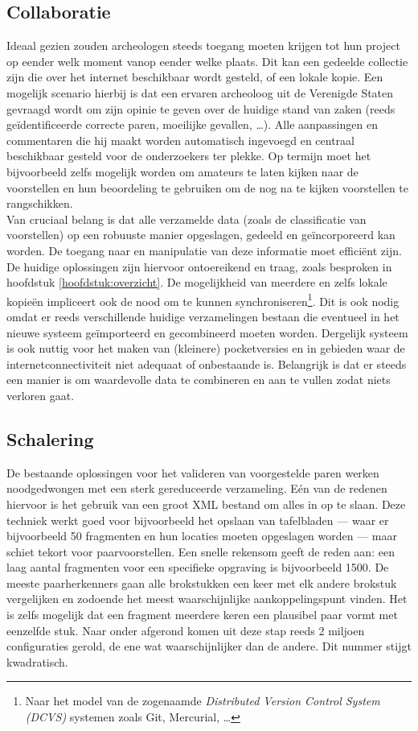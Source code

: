 \subsection{Collaboratie}
Ideaal gezien zouden archeologen steeds toegang moeten krijgen tot hun project op eender welk moment vanop eender welke plaats. Dit kan een gedeelde collectie zijn die over het internet beschikbaar wordt gesteld, of een lokale kopie. Een mogelijk scenario hierbij is dat een ervaren archeoloog uit de Verenigde Staten gevraagd wordt om zijn opinie te geven over de huidige stand van zaken (reeds ge\"identificeerde correcte paren, moeilijke gevallen, \ldots). Alle aanpassingen en commentaren die hij maakt worden automatisch ingevoegd en centraal beschikbaar gesteld voor de onderzoekers ter plekke. Op termijn moet het bijvoorbeeld zelfs mogelijk worden om amateurs te laten kijken naar de voorstellen en hun beoordeling te gebruiken om de nog na te kijken voorstellen te rangschikken.\\

Van cruciaal belang is dat alle verzamelde data (zoals de classificatie van voorstellen) op een robuuste manier opgeslagen, gedeeld en ge\"incorporeerd kan worden. De toegang naar en manipulatie van deze informatie moet effici\"ent zijn. De huidige oplossingen zijn hiervoor ontoereikend en traag, zoals besproken in hoofdstuk \ref{hoofdstuk:overzicht}. De mogelijkheid van meerdere en zelfs lokale kopie\"en impliceert ook de nood om te kunnen synchroniseren\footnote{Naar het model van de zogenaamde \emph{Distributed Version Control System (DCVS)} systemen zoals Git, Mercurial, \ldots}. Dit is ook nodig omdat er reeds verschillende huidige verzamelingen bestaan die eventueel in het nieuwe systeem ge\"importeerd en gecombineerd moeten worden. Dergelijk systeem is ook nuttig voor het maken van (kleinere) pocketversies en in gebieden waar de internetconnectiviteit niet adequaat of onbestaande is. Belangrijk is dat er steeds een manier is om waardevolle data te combineren en aan te vullen zodat niets verloren gaat.

\subsection{Schalering}
De bestaande oplossingen voor het valideren van voorgestelde paren werken noodgedwongen met een sterk gereduceerde verzameling. E\'en van de redenen hiervoor is het gebruik van een groot XML bestand om alles in op te slaan. Deze techniek werkt goed voor bijvoorbeeld het opslaan van tafelbladen --- waar er bijvoorbeeld 50 fragmenten en hun locaties moeten opgeslagen worden --- maar schiet tekort voor paarvoorstellen. Een snelle rekensom geeft de reden aan: een laag aantal fragmenten voor een specifieke opgraving is bijvoorbeeld 1500. De meeste paarherkenners gaan alle brokstukken een keer met elk andere brokstuk vergelijken en zodoende het meest waarschijnlijke aankoppelingspunt vinden. Het is zelfs mogelijk dat een fragment meerdere keren een plausibel paar vormt met eenzelfde stuk. Naar onder afgerond komen uit deze stap reeds 2 miljoen configuraties gerold, de ene wat waarschijnlijker dan de andere. Dit nummer stijgt kwadratisch.

